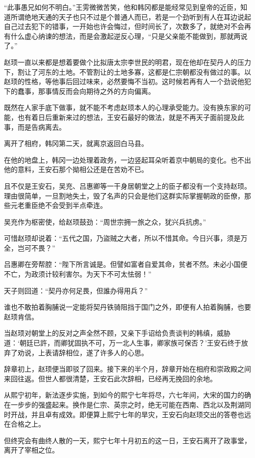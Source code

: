 “此事愚兄如何不明白。”王雱微微苦笑，他和韩冈都是能经常见到皇帝的近臣，知道所谓绝地天通的天子也只不过是个普通人而已，若是一个劲听到有人在耳边说起自己过去犯下的错事，一开始也许会悔过，但时间长了，次数多了，就绝对不会再有什么虚心纳谏的想法，而是会激起逆反心理，“只是父亲能不能做到，那就两说了。”

赵顼一直以来都是想着要做个比拟唐太宗李世民的明君，现在他却在契丹人的压力下，割让了河东的土地。不管割让的土地多寡，这都是仁宗朝都没有做过的事。以赵顼的性格，等他事后回过味来，必然要悔不当初。这时候若再有人一个劲说他犯下的蠢事，那事情反而会向期待之外的方向偏离。

既然在人家手底下做事，就不能不考虑赵顼本人的心理承受能力。没有换东家的可能，也有着日后重新来过的想法，王安石最好的做法，就是不再天子面前提及此事，而是告病离去。

离开了相府，韩冈第二天，就离京返回白马县。

在他的地盘上，韩冈一边处理着政务，一边竖起耳朵听着京中朝局的变化。也不出他的意料，王安石那个拗相公还是在苦劝不已。

且不仅是王安石，吴充、吕惠卿等一干身居朝堂之上的臣子都没有一个支持赵顼。理由很简单，一旦割地失土，毁了名声的只会是他们这群实际掌握朝政的臣僚，那些元老重臣绝不会受到半点牵连。

吴充作为枢密使，给赵顼鼓劲：“周世宗拥一旅之众，犹兴兵抗虏。”

可惜赵顼却说着：“五代之国，乃盜贼之大者，所以不惜其命。今日兴事，须是万全，岂可不畏？”

吕惠卿在旁帮腔：“陛下所言诚是。但譬如富者自爱其命，贫者不然。未必小国便不亡，为政须计较利害尔。为天下不可太怯弱！”

天子则回道：“契丹亦何足畏，但誰办得用兵？”

谁也不敢拍着胸脯说一定能将契丹铁骑阻挡于国门之外，即便有人拍着胸脯，也要赵顼肯信。

当赵顼对朝堂上的反对之声全然不顾，又亲下手诏给负责谈判的韩缜，威胁道：‘朝廷已許，而卿犹固执不可，万一北人生事，卿家族可保否？’王安石终于放弃了劝说，上表请辞相位，遂了许多人的心思。

辞章初上，赵顼便当即驳了回来。接下来的半个月，辞章开始在相府和崇政殿之间来回往返。但世人都很清楚，王安石此次辞相，已经再无挽回的余地。

从熙宁初年，新法逐步实施，到如今的熙宁七年将尽，六七年间，大宋的国力的确在一步步的强盛起来。换作是仁宗、英宗之时，绝无可能在西南、西北以及荆湖同时开战，并且卓有成效。即便算上熙宁七年的旱灾，王安石向赵顼交出的答卷也远在合格之上。

但终究会有曲终人散的一天，熙宁七年十月初五的这一日，王安石离开了政事堂，离开了宰相之位。

